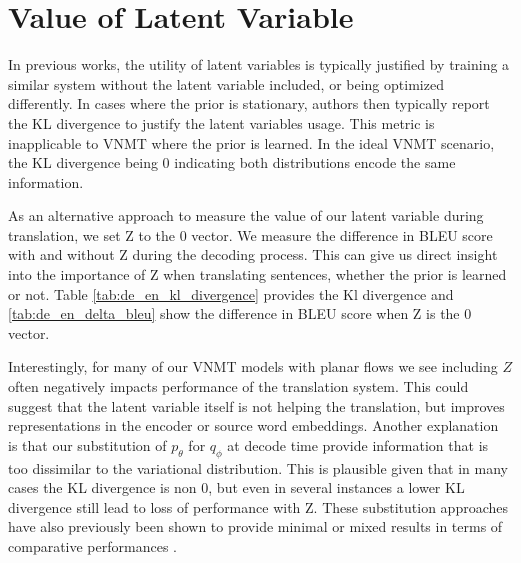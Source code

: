 \section{Value of Latent Variable} 



In previous works, the utility of latent variables is typically justified by training a similar system without the latent variable included, or being optimized differently.  In cases where the prior is stationary, authors then typically report the KL divergence to justify the latent variables usage. This metric is inapplicable to \ac{VNMT} where the prior is learned. In the ideal \ac{VNMT} scenario, the KL divergence being 0 indicating both distributions encode the same information.

As an alternative approach to measure the value of our latent variable during translation, we set Z to the 0 vector. We measure the difference in BLEU score with and without Z during the decoding process. This can give us direct insight into the importance of Z when translating sentences, whether the prior is learned or not. Table \ref{tab:de_en_kl_divergence} provides the Kl divergence and \ref{tab:de_en_delta_bleu} show the difference in BLEU score when Z is the 0 vector. 

Interestingly, for many of our \ac{VNMT} models with planar flows we see including $Z$ often negatively impacts performance of the translation system. This could suggest that the latent variable itself is not helping the translation, but improves representations in the encoder or source word embeddings. Another explanation is that our substitution of $p_{\theta}$ for $q_{\phi}$ at decode time provide information that is too dissimilar to the variational distribution. This is plausible given that in many cases the KL divergence is non 0, but even in several instances a lower KL divergence still lead to loss of performance with Z. These substitution approaches have also previously been shown to provide minimal or mixed results in terms of comparative performances \cite{eikema2018AEVNMT}.

